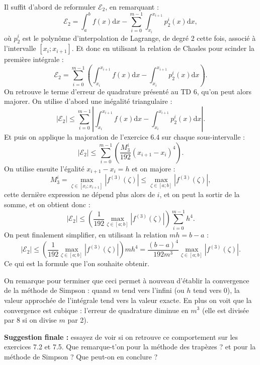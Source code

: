 \documentclass{article}
\begin{document}
Il suffit d'abord de reformuler $\mathcal{E}_2$, en remarquant :
\[
\mathcal{E}_2 = \int_a^b f(x) \mathrm{d}x - \sum_{i=0}^{m-1} \int_{x_i}^{x_{i+1}} p_2^i(x) \mathrm{d}x,
\]
où $p_2^i$ est le polynôme d'interpolation de Lagrange, de degré 2 cette fois, associé à l'intervalle $[x_i;x_{i+1}]$.
Et donc en utilisant la relation de Chasles pour scinder la première intégrale :
\[
\mathcal{E}_2 = \sum_{i=0}^{m-1} \left (\int_{x_i}^{x_{i+1}} f(x) \mathrm{d}x - \int_{x_i}^{x_{i+1}} p_2^i(x) \mathrm{d}x \right ).
\]
On retrouve le terme d'erreur de quadrature présenté au TD 6, qu'on peut alors majorer. On utilise d'abord une inégalité triangulaire :
\[
| \mathcal{E}_2 | \leq  \sum_{i=0}^{m-1} \left  | \int_{x_i}^{x_{i+1}} f(x) \mathrm{d}x - \int_{x_i}^{x_{i+1}} p_2^i(x) \mathrm{d}x \right |.
\]
Et puis on applique la majoration de l'exercice 6.4 sur chaque sous-intervalle :
\[
| \mathcal{E}_2 | \leq  \sum_{i=0}^{m-1} \left  ( \frac{M_3^i}{192} (x_{i+1}-x_i)^4 \right ).
\]
On utilise ensuite l'égalité $x_{i+1}-x_i=h$ et on majore :
\[
M_3^i = \max_{\zeta \in [x_i;x_{i+1}]} |f^{(3)}(\zeta)| \leq
\max_{\zeta \in [a;b]} |f^{(3)}(\zeta)|,
\]
cette dernière expression ne dépend plus alors de $i$, et on peut la sortir de la somme, et on obtient donc :
\[
| \mathcal{E}_2 | \leq  \left  ( \frac{1}{192} \max_{\zeta \in [a;b]} |f^{(3)}(\zeta)|  \right ) \sum_{i=0}^{m-1} h^4.
\]
On peut finalement simplifier, en utilisant la relation $m h = b - a$ :
\[
| \mathcal{E}_2 | \leq  \left  ( \frac{1}{192} \max_{\zeta \in [a;b]} |f^{(3)}(\zeta)|  \right ) m h^4
= \frac{(b-a)^4}{192 m^3} \max_{\zeta \in [a;b]} |f^{(3)}(\zeta)|. 
\]
Ce qui est la formule que l'on souhaite obtenir.

\medskip

On remarque pour terminer que ceci permet à nouveau d'établir la convergence de la méthode de Simpson : quand $m$ tend vers l'infini (ou $h$ tend vers $0$), la valeur approchée de l'intégrale tend vers la valeur exacte. En plus on voit que la convergence est cubique : l'erreur de quadrature diminue en $m^3$ (elle est divisée par 8 si on divise $m$ par 2).

\medskip

{\bf Suggestion finale :} essayez de voir si on retrouve ce comportement sur les exercices 7.2 et 7.5. Que remarque-t'on pour la méthode des trapèzes ? et pour la méthode de Simpson ? Que peut-on en conclure ?
\end{document}
